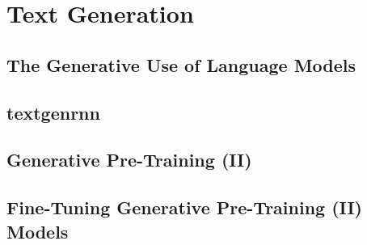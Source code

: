 \section{Text Generation}\label{sec:introduction:text-generation}

\subsection{The Generative Use of Language Models}\label{sec:text-generation:language-models}
\subsection{textgenrnn}\label{sec:text-generation:textgenrnn}
\subsection{Generative Pre-Training (II)}\label{sec:text-generation:gpt-2}
\subsection{Fine-Tuning Generative Pre-Training (II) Models}\label{sec:text-generation-fine-tuning-gpt-2}


